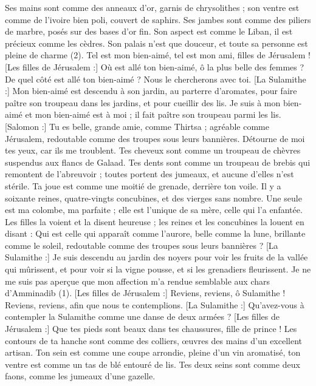 \begin{multicols}{2}
Ses mains sont comme des anneaux d'or, garnis de chrysolithes ; son ventre est comme de l’ivoire bien poli, couvert de saphirs.
Ses jambes sont comme des piliers de marbre, posés sur des bases d’or fin. Son aspect est comme le Liban, il est précieux comme les cèdres.
Son palais n'est que douceur, et toute sa personne est pleine de charme (2). Tel est mon bien-aimé, tel est mon ami, filles de Jérusalem !
\VerseOne{}[Les filles de Jérusalem :] Où est allé ton bien-aimé, ô la plus belle des femmes ? De quel côté est allé ton bien-aimé ? Nous le chercherons avec toi.
[La Sulamithe :] Mon bien-aimé est descendu à son jardin, au parterre d’aromates, pour faire paître son troupeau dans les jardins, et pour cueillir des lis.
Je suis à mon bien-aimé et mon bien-aimé est à moi ; il fait paître son troupeau parmi les lis.
[Salomon :] Tu es belle, grande amie, comme Thirtsa ; agréable comme Jérusalem, redoutable comme des troupes sous leurs bannières.
Détourne de moi tes yeux, car ils me troublent. Tes cheveux sont comme un troupeau de chèvres suspendus aux flancs de Galaad.
Tes dents sont comme un troupeau de brebis qui remontent de l’abreuvoir ; toutes portent des jumeaux, et aucune d'elles n'est stérile.
Ta joue est comme une moitié de grenade, derrière ton voile.
Il y a soixante reines, quatre-vingts concubines, et des vierges sans nombre.
Une seule est ma colombe, ma parfaite ; elle est l’unique de sa mère, celle qui l'a enfantée. Les filles la voient et la disent heureuse ; les reines et les concubines la louent en disant :
Qui est celle qui apparaît comme l’aurore, belle comme la lune, brillante comme le soleil, redoutable comme des troupes sous leurs bannières ?
[La Sulamithe :] Je suis descendu au jardin des noyers pour voir les fruits de la vallée qui mûrissent, et pour voir si la vigne pousse, et si les grenadiers fleurissent.
Je ne me suis pas aperçue que mon affection m'a rendue semblable aux chars d’Amminadib (1).
\VerseOne{}[Les filles de Jérusalem :] Reviens, reviens, ô Sulamithe ! Reviens, reviens, afin que nous te contemplions. [La Sulamithe :] Qu’avez-vous à contempler la Sulamithe comme une danse de deux armées ?
[Les filles de Jérusalem :] Que tes pieds sont beaux dans tes chaussures, fille de prince ! Les contours de ta hanche sont comme des colliers, œuvres des mains d'un excellent artisan.
Ton sein est comme une coupe arrondie, pleine d’un vin aromatisé, ton ventre est comme un tas de blé entouré de lis.
Tes deux seins sont comme deux faons, comme les jumeaux d'une gazelle.

\end{multicols}
